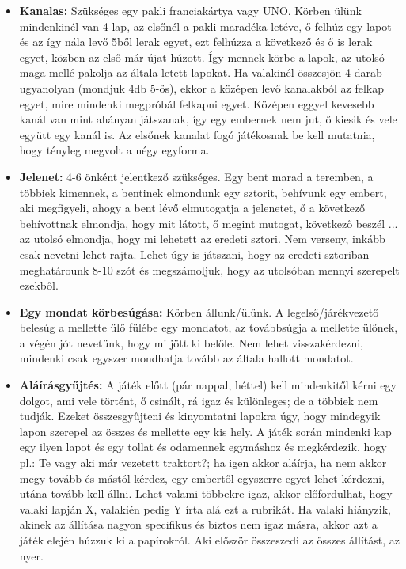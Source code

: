 \documentclass[a4paper, 12pt, twoside, openright]{article}
\begin{document}
\begin{itemize}
\item \textbf{Kanalas:} Szükséges egy pakli franciakártya vagy UNO. Körben ülünk mindenkinél van 4 lap, az elsőnél a pakli maradéka letéve, ő felhúz egy lapot és az így nála levő 5ből lerak egyet, ezt felhúzza a következő és ő is lerak egyet, közben az első már újat húzott. Így mennek körbe a lapok, az utolsó maga mellé pakolja az általa letett lapokat. Ha valakinél összesjön 4 darab ugyanolyan (mondjuk 4db  5-ös), ekkor a középen levő kanalakból az felkap egyet, mire mindenki megpróbál felkapni egyet. Középen eggyel kevesebb kanál van mint ahányan játszanak, így egy embernek nem jut, ő kiesik és vele együtt egy kanál is. Az elsőnek kanalat fogó játékosnak be kell mutatnia, hogy tényleg megvolt a négy egyforma.

\item \textbf{Jelenet:} 4-6 önként jelentkező szükséges. Egy bent marad a teremben, a többiek kimennek, a bentinek elmondunk egy sztorit, behívunk egy embert, aki megfigyeli, ahogy a bent lévő elmutogatja a jelenetet, ő a következő behívottnak elmondja, hogy mit látott, ő megint mutogat, következő beszél ... az utolsó elmondja, hogy mi lehetett az eredeti sztori. Nem verseny, inkább csak nevetni lehet rajta. Lehet úgy is játszani, hogy az eredeti sztoriban meghatárounk 8-10 szót és megszámoljuk, hogy az utolsóban mennyi szerepelt ezekből.

\item \textbf{Egy mondat körbesúgása:} Körben állunk/ülünk. A legelső/járékvezető belesúg a mellette ülő fülébe egy mondatot, az továbbsúgja a mellette ülőnek, a végén jót nevetünk, hogy mi jött ki belőle. Nem lehet visszakérdezni, mindenki csak egyszer mondhatja tovább az általa hallott mondatot.

\item \textbf{Aláírásgyűjtés:} A játék előtt (pár nappal, héttel) kell mindenkitől kérni egy dolgot, ami vele történt, ő csinált, rá igaz és különleges; de a többiek nem tudják. Ezeket összesgyűjteni és kinyomtatni lapokra úgy, hogy mindegyik lapon szerepel az összes és mellette egy kis hely. A játék során mindenki kap egy ilyen lapot és egy tollat és odamennek egymáshoz és megkérdezik, hogy pl.: Te vagy aki már vezetett traktort?; ha igen akkor aláírja, ha nem akkor megy tovább és mástól kérdez, egy embertől egyszerre egyet lehet kérdezni, utána tovább kell állni. Lehet valami többekre igaz, akkor előfordulhat, hogy valaki lapján X, valakién pedig Y írta alá ezt a rubrikát. Ha valaki hiányzik, akinek az állítása nagyon specifikus és biztos nem igaz másra, akkor azt a játék elején húzzuk ki a papírokról. Aki először összeszedi az összes állítást, az nyer.


\end{itemize}
\end{document}
